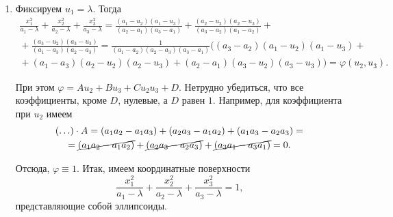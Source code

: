 \begin{solution}
	\begin{enumerate}[nolistsep, label=(\arabic*)]
		\item Фиксируем $u_1 = \lambda$. Тогда
			\begin{multline*}
				\frac{x_1^2}{a_1 - \lambda} + \frac{x_2^2}{a_2 - \lambda} + \frac{x_3^2}{a_3 - \lambda} = \frac{(a_1 - u_2)(a_1 - u_3)}{(a_2 - a_1)(a_3 - a_1)} + \frac{(a_2 - u_2)(a_2 - u_3)}{(a_3 - a_2)(a_1 - a_2)} + {}\\{} + \frac{(a_3 - u_2)(a_3 - u_3)}{(a_1 - a_3)(a_2 - a_3)} = \frac{1}{(a_1 - a_2)(a_2 - a_3)(a_3 - a_1)}\Big((a_3 - a_2)(a_1 - u_2)(a_1 - u_3) + {}\\{} + (a_1 - a_3)(a_2 - u_2)(a_2 - u_3) + (a_2 - a_1)(a_3 - u_2)(a_3 - u_3)\Big) = \varphi(u_2, u_3).
			\end{multline*}

			При этом $\varphi = Au_2 + Bu_3 + Cu_2u_3 + D$. Нетрудно убедиться, что все коэффициенты, кроме $D$, нулевые, а $D$ равен $1$. Например, для коэффициента при $u_2$ имеем
			\begin{multline*}
				(\ldots) \cdot A = (a_1a_2 - a_1a_3) + (a_2a_3 - a_1a_2) + (a_1a_3 - a_2a_3) = \\= \cancel{(a_1a_2 - a_1a_2)} + \cancel{(a_2a_3 - a_2a_3)} + \cancel{(a_3a_1 - a_3a_1)} = 0.
			\end{multline*}

			Отсюда, $\varphi \equiv 1$. Итак, имеем координатные поверхности
			\[
				\frac{x_1^2}{a_1 - \lambda} + \frac{x_2^2}{a_2 - \lambda} + \frac{x_3^2}{a_3 - \lambda} = 1,
			\]
			представляющие собой эллипсоиды.


\end{enumerate}
\end{solution}
